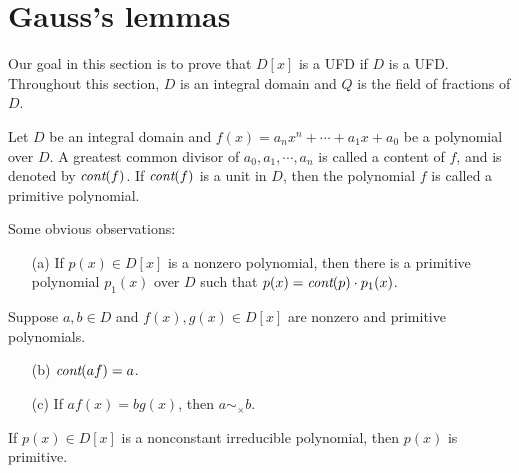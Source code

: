 \section{Gauss's lemmas}

Our goal in this section is to prove that $D[x]$ is a UFD if $D$ is a UFD.
Throughout this section, $D$ is an integral domain and $Q$ is the field of fractions of $D$.

\begin{defi}
    Let $D$ be an integral domain and $f(x)=a_nx^n+\cdots+a_1x+a_0$ be a polynomial over $D$.
    A greatest common divisor of $a_0, a_1, \cdots, a_n$ is called a content of $f$, and is denoted by $\textit{cont}(f)$.
    If $\textit{cont}(f)$ is a unit in $D$, then the polynomial $f$ is called a primitive polynomial.
\end{defi}

Some obvious observations:
\begin{obs}
    \begin{enumerate}
        \item[(a)]
        {
            If $p(x)\in D[x]$ is a nonzero polynomial, then there is a primitive polynomial $p_1(x)$ over $D$ such that $p(x)=\textit{cont}(p)\cdot p_1(x)$.
        }
    \end{enumerate}
    Suppose $a, b\in D$ and $f(x), g(x)\in D[x]$ are nonzero and primitive polynomials.
        \begin{enumerate}
        \item[(b)]
        {
            $\textit{cont}(af)=a$.
        }
        \item[(c)]
        {
            If $af(x)=bg(x)$, then $a\sim_\times b$.
        }
    \end{enumerate}
\end{obs}
\begin{exmp}
    If $p(x)\in D[x]$ is a nonconstant irreducible polynomial, then $p(x)$ is primitive.
\end{exmp}

